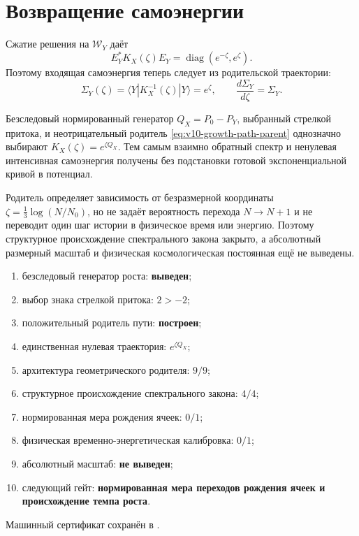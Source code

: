 \section{Возвращение самоэнергии}

Сжатие решения на $\mathcal W_Y$ даёт
\begin{equation}
 E_Y^*K_X(\zeta)E_Y
 =\operatorname{diag}(e^{-\zeta},e^{\zeta}).
 \label{eq:v10-growth-parent-compression}
\end{equation}
Поэтому входящая самоэнергия теперь следует из родительской траектории:
\begin{equation}
 \Sigma_Y(\zeta)
 =\langle Y|K_X^{-1}(\zeta)|Y\rangle=e^{\zeta},
 \qquad
 \frac{d\Sigma_Y}{d\zeta}=\Sigma_Y.
 \label{eq:v10-growth-parent-self-energy}
\end{equation}

\begin{theorem}
Безследовый нормированный генератор $Q_X=P_0-P_Y$, выбранный стрелкой
притока, и неотрицательный родитель \eqref{eq:v10-growth-path-parent}
однозначно выбирают $K_X(\zeta)=e^{\zeta Q_X}$. Тем самым взаимно обратный
спектр и ненулевая интенсивная самоэнергия получены без подстановки готовой
экспоненциальной кривой в потенциал.
\end{theorem}

\begin{nogocriterion}
Родитель определяет зависимость от безразмерной координаты
$\zeta=\frac13\log(N/N_0)$, но не задаёт вероятность перехода $N\to N+1$
и не переводит один шаг истории в физическое время или энергию. Поэтому
структурное происхождение спектрального закона закрыто, а абсолютный
размерный масштаб и физическая космологическая постоянная ещё не выведены.
\end{nogocriterion}

\begin{protocol}\begin{enumerate}
\item безследовый генератор роста: \textbf{выведен};
\item выбор знака стрелкой притока: \textbf{$2>-2$};
\item положительный родитель пути: \textbf{построен};
\item единственная нулевая траектория: \textbf{$e^{\zeta Q_X}$};
\item архитектура геометрического родителя: \textbf{$9/9$};
\item структурное происхождение спектрального закона: \textbf{$4/4$};
\item нормированная мера рождения ячеек: \textbf{$0/1$};
\item физическая временно-энергетическая калибровка: \textbf{$0/1$};
\item абсолютный масштаб: \textbf{не выведен};
\item следующий гейт: \textbf{нормированная мера переходов рождения ячеек
и происхождение темпа роста}.
\end{enumerate}\end{protocol}

Машинный сертификат сохранён в
.